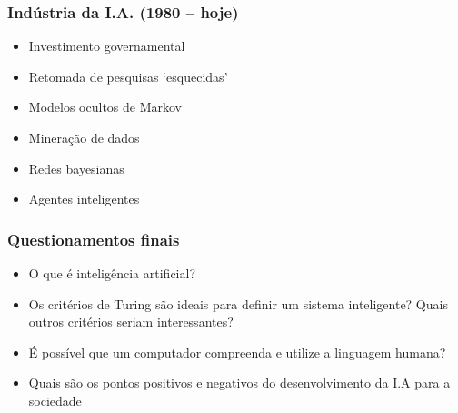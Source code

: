 \documentclass[aspectratio=169]{beamer}
\begin{document}
	\begin{frame}
		\frametitle{Indústria da I.A. (1980 – hoje)}
		\begin{itemize}
			\item Investimento governamental
			
			\item Retomada de pesquisas ‘esquecidas’
			
			\item Modelos ocultos de Markov
			
			\item Mineração de dados
			
			\item Redes bayesianas
			
			\item Agentes inteligentes		
		\end{itemize}
	\end{frame}

	\begin{frame}
		\frametitle{Questionamentos finais}
		\begin{itemize}
			\item O que é inteligência artificial?
			
			\item Os critérios de Turing são ideais para definir um sistema inteligente? Quais outros critérios seriam interessantes?
			
			\item É possível que um computador compreenda e utilize a linguagem humana?
			
			\item Quais são os pontos positivos e negativos do desenvolvimento da I.A  para a sociedade			
		\end{itemize}
	\end{frame}
		
	\begin{frame}

	\end{frame}
\end{document}
